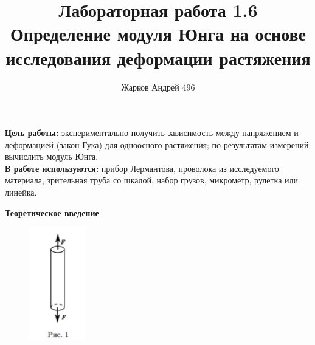 \documentclass[12pt]{article}
\begin{document}
	\author {Жарков Андрей 496}
	\title {Лабораторная работа 1.6 \\ Определение модуля Юнга на основе
		исследования деформации растяжения}
	\maketitle{}
	
	\indent
	\textbf{Цель работы:} экспериментально получить зависимость между напряжением и деформацией (закон Гука) для одноосного растяжения;
	по результатам измерений вычислить модуль Юнга.
	\\\newline
	\indent
	\textbf{В работе используются:} прибор Лермантова, проволока из исследуемого материала, зрительная труба со шкалой, набор грузов, микрометр, рулетка или линейка.
	
	\begin{center}
		\textbf{Теоретическое введение}
	\end{center}
	
	\begin{figure}
		\includegraphics[width=2.5cm]{6_1}
	\end{figure}
	
\end{document}
